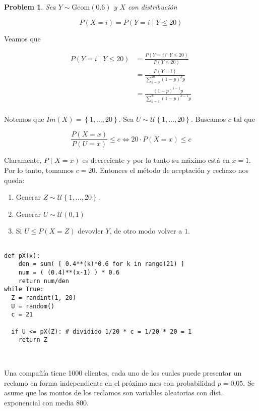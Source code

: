 \documentclass[a4paper, 12pt]{article}
\newtheorem{problem}{Problem}
\newtheorem{problem}{Problem}
\begin{document}
\begin{problem}
  Sea $Y \sim \text{Geom}(0.6)$ y $X$ con distribución 

  \begin{equation*}
    P(X = i) = P(Y = i \mid Y \leq 20)
  \end{equation*}
\end{problem}

Veamos que 

\begin{align*}
  P(Y = i \mid Y \leq 20) 
  &= \frac{P( Y = i \cap  Y \leq 20 )}{P(Y \leq 20)} \\
  &= \frac{P(Y =
  i)}{\sum_{k=0}^{20} (1-p)^k p} \\ 
  &= \frac{(1-p)^{i-1}p}{\sum_{k=1}^{21} (1-p)^{k-1} p} \\ 
\end{align*}

Notemos que $Im(X) = \left\{ 1,\ldots, 20 \right\} $. Sea $U \sim \mathcal{U}\left\{ 1, \ldots, 20
\right\} $. Buscamos $c$ tal que 

\begin{equation*}
  \frac{P(X=x)}{P(U = x)} \leq c \iff 20\cdot P(X = x) \leq c
\end{equation*}

Claramente, $P(X = x)$ es decreciente y por lo tanto su máximo está en $x = 1$.
Por lo tanto, tomamos $c = 20$. Entonces el método de aceptación y rechazo nos
queda:

\begin{enumerate}
  \item Generar $Z \sim \mathcal{U}\left\{ 1, \ldots, 20 \right\} $. 
  \item Generar $U \sim \mathcal{U}(0, 1)$
  \item Si $U \leq P(X = Z)$ devovler $Y$, de otro modo volver a $1$.
\end{enumerate}

\begin{verbatim}
  
def pX(x):
    den = sum( [ 0.4**(k)*0.6 for k in range(21) ]
    num = ( (0.4)**(x-1) ) * 0.6
    return num/den
while True:
  Z = randint(1, 20)
  U = random()
  c = 21

  if U <= pX(Z): # dividido 1/20 * c = 1/20 * 20 = 1
    return Z



\end{verbatim}

\pagebreak 

Una compañía tiene 1000 clientes, cada uno de los cuales puede presentar un
reclamo en forma independiente en el próximo mes con probabilidad $p=0.05$. Se
asume que los montos de los reclamos son variables aleatorias con dist.
exponencial con media $800$.
\end{document}
